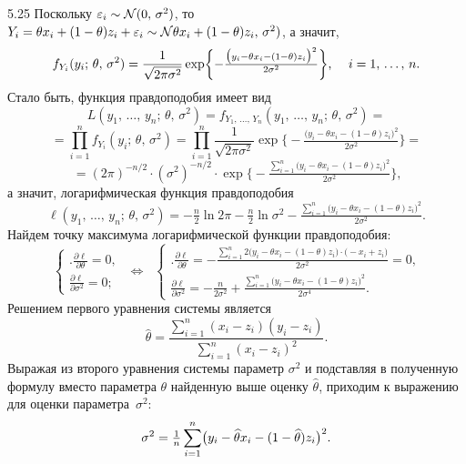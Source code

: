 \begin{solution}{{5.25}}
Поскольку $\varepsilon_i \sim \mathcal{N}(0, \, \sigma^2)$, то $Y_i = \theta x_i + (1 - \theta) z_i + \varepsilon_i \sim \mathcal{N}\theta x_i + (1 - \theta) z_i, \, \sigma^2)$, а значит,
\[
    f_{Y_i}(y_i; \, \theta, \, \sigma^2) = \frac{1}{\sqrt{2\pi\sigma^2}} \exp\biggl\{-\tfrac{\bigl(y_i - \theta x_i - (1 - \theta) z_i\bigr)^2}{2\sigma^2}\biggr\} \text{, \quad} i = 1, \, \ldots, \, n \text{.}
\]
Стало быть, функция правдоподобия имеет вид
\[
    L(y_1, \, \ldots, \, y_n; \, \theta, \, \sigma^2) = f_{Y_1, \, \ldots, \, Y_n}(y_1, \, \ldots, \, y_n; \, \theta, \, \sigma^2) =
\]
\[
    = \prod_{i=1}^{n}f_{Y_i}(y_i; \, \theta, \, \sigma^2) = \prod_{i=1}^{n}\frac{1}{\sqrt{2\pi\sigma^2}} \exp\biggl\{-\tfrac{\bigl(y_i - \theta x_i - (1 - \theta) z_i\bigr)^2}{2\sigma^2}\biggr\} =
\]
\[
    = (2\pi)^{-n/2} \cdot (\sigma^2)^{-n/2} \cdot \exp\biggl\{-\tfrac{\sum_{i=1}^{n}\bigl(y_i - \theta x_i - (1 - \theta) z_i\bigr)^2}{2\sigma^2}\biggr\} \text{,}
\]
а значит, логарифмическая функция правдоподобия
\[
    \ell(y_1, \, \ldots, \, y_n; \, \theta, \, \sigma^2) = -\tfrac{n}{2}\ln{2\pi} -\tfrac{n}{2}\ln{\sigma^2} -\tfrac{\sum_{i=1}^{n}\bigl(y_i - \theta x_i - (1 - \theta) z_i\bigr)^2}{2\sigma^2} \text{.}
\]
Найдем точку максимума логарифмической функции правдоподобия:
\[
    \left\{
      \begin{array}{ll}
        \biggl. \frac{\partial \ell}{\partial \theta} = 0 \text{,} \\
                \frac{\partial \ell}{\partial \sigma^2} = 0 \text{;}
      \end{array}
    \right. \;\; \Leftrightarrow \;\;
    \left\{
      \begin{array}{ll}
        \biggl. \frac{\partial \ell}{\partial \theta} = -\tfrac{\sum_{i=1}^{n}2\bigl(y_i - \theta x_i - (1 - \theta) z_i\bigr)\cdot \bigl(- x_i + z_i\bigr)}{2\sigma^2} = 0 \text{,} \\
                \frac{\partial \ell}{\partial \sigma^2} = -\tfrac{n}{2\sigma^2} +\tfrac{\sum_{i=1}^{n}\bigl(y_i - \theta x_i - (1 - \theta) z_i\bigr)^2}{2\sigma^4} \text{.}
      \end{array}
    \right.
\]
Решением первого уравнения системы является
\[
    \hat{\theta} = \frac{\sum_{i=1}^{n}(x_i - z_i)(y_i - z_i)}{\sum_{i=1}^{n}(x_i - z_i)^2} \text{.}
\]
Выражая из второго уравнения системы параметр $\sigma^2$ и подставляя в полученную формулу вместо параметра $\theta$ найденную выше оценку $\widehat{\theta}$, приходим к выражению для оценки параметра~$\sigma^2$:
\[
    \sigma^2 = \tfrac{1}{n}\sum_{i=1}^{n}\bigl(y_i - \widehat{\theta} x_i - (1 - \widehat{\theta}) z_i\bigr)^2 \text{.}
\]
\end{solution}
